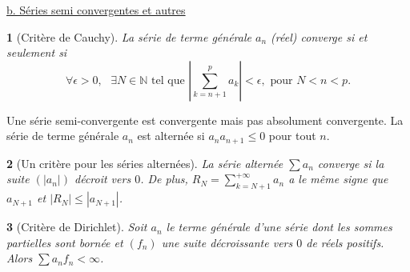 \documentclass[8pt,notheorems]{beamer}
\newtheorem{prop}{\translate{Proposition}}
\theoremstyle{definition}
\theoremstyle{example}
\theoremstyle{mystyle}
\theoremstyle{plain}
\begin{document}
\begin{frame}[allowframebreaks]
\underline{b. Séries semi convergentes et autres}\\
\begin{prop}[Critère de Cauchy]
La série de terme générale $a_n$ (réel) converge si et seulement si
$$
 \forall \epsilon >0, \text{ }\exists N\in \mathbb{N} \text{ tel que }\left|\sum_{k = n+1}^p a_k\right|<\epsilon,\text{ pour }N<n<p.
$$
\end{prop}
Une série semi-convergente est convergente mais pas absolument convergente. La série de terme générale $a_n$ est alternée si $a_n a_{n+1}\leq0$ pour tout $n$.
\begin{prop}[Un critère pour les séries alternées]
La série alternée $\sum a_n$ converge si la suite $(|a_n|)$ décroit vers $0$. De plus, $R_N = \sum_{k = N+1}^{+\infty}a_n$ a le même signe que $a_{N+1}$ et $|R_N|\leq |a_{N+1}|$.
\end{prop}
\begin{prop}[Critère de Dirichlet]
Soit $a_n$ le terme générale d'une série dont les sommes partielles sont bornée et $(f_n)$ une suite décroissante vers $0$ de réels positifs. Alors $\sum a_nf_n<\infty$.
\end{prop}
\end{frame}
\end{document}
